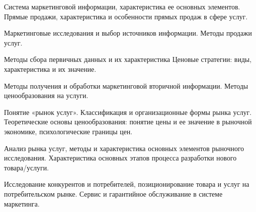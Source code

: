 \documentclass[
	14pt,
	a4paper,
	]
	{scrartcl}
\begin{document}
\vfill

\newpage


\shapk
{}
\setcounter{zad}{0}

\vfill
\z Система маркетинговой информации, характеристика ее основных элементов.
 \vfill
\z Прямые продажи, характеристика и особенности прямых продаж в сфере услуг.
 \vfill

\vfill

\newpage


\shapk
{}
\setcounter{zad}{0}

\vfill
\z Маркетинговые исследования и выбор источников информации.
 \vfill
\z Методы продажи услуг.
 \vfill

\vfill

\newpage


\shapk
{}
\setcounter{zad}{0}

\vfill
\z Методы сбора первичных данных и их характеристика
 \vfill
\z Ценовые стратегии: виды, характеристика и их значение. 
 \vfill

\vfill

\newpage


\shapk
{}
\setcounter{zad}{0}

\vfill
\z Методы получения и обработки маркетинговой вторичной информации.
 \vfill
\z Методы ценообразования на услуги.
 \vfill

\vfill

\newpage


\shapk
{}
\setcounter{zad}{0}

\vfill
\z Понятие «рынок услуг». Классификация и организационные формы рынка услуг.
 \vfill
\z Теоретические основы ценообразования: понятие цены и ее значение в рыночной экономике, психологические границы цен.
 \vfill

\vfill

\newpage


\shapk
{}
\setcounter{zad}{0}

\vfill
\z Анализ рынка услуг, методы и характеристика основных элементов рыночного исследования.
 \vfill
\z Характеристика основных этапов процесса разработки нового товара/услуги.
 \vfill

\vfill

\newpage


\shapk
{}
\setcounter{zad}{0}

\vfill
\z Исследование конкурентов и потребителей, позиционирование товара и услуг на потребительском рынке.
 \vfill
\z Сервис и гарантийное обслуживание в системе маркетинга.
 \vfill
\end{document}
